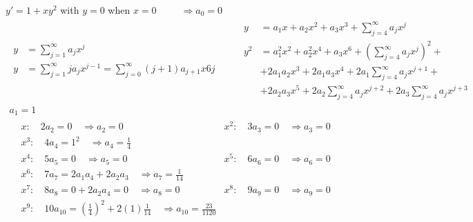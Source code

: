 \documentclass[twoside]{amsart}
\theoremstyle{plain}
\theoremstyle{definition}
\newcommand{\exercisehead}[1]
  {\smallskip
   \noindent{\small\bf Exercise #1.}}
\begin{document}
\exercisehead{13} $y' = 1 + xy^2$ with $y=0$ when $x=0$  $\quad \quad \, \Longrightarrow a_0 = 0$  
\[
\begin{gathered}
  \begin{aligned}
    y & = \sum_{j=1}^{\infty} a_j x^j \\
    y & = \sum_{j=1}^{\infty} j a_j x^{j-1} = \sum_{j=0}^{\infty} (j+1)a_{j+1} x6j 
  \end{aligned} \quad \quad \, 
\begin{aligned}
  y & = a_1 x + a_2 x^2 + a_3 x^3 + \sum_{j=4}^{\infty} a_j x^j \\
  y^2 & = a_1^2 x^2 + a_2^2 x^4 + a_3 x^6 + \left( \sum_{j=4}^{\infty}a_j x^j \right)^2 + \\
  & + 2 a_1 a_2 x^3 + 2 a_1 a_3 x^4 + 2a_1 \sum_{j=4}^{\infty} a_j x^{j+1} + \\
  & + 2a_2 a_3 x^5 + 2a_2 \sum_{j=4}^{\infty} a_j x^{j+2} + 2a_3 \sum_{j=4}^{\infty} a_j x^{j+3} 
\end{aligned} \\
\boxed{ a_1 = 1  } \\
\begin{aligned}
  & x: \quad 2a_2 = 0 \quad \Longrightarrow a_2 = 0  
  & x^2: \quad 3 a_3 = 0 \quad \Longrightarrow a_3 = 0 \\
  & x^3: \quad 4a_4 = 1^2 \quad \Longrightarrow \boxed{ a_4 = \frac{1}{4} }  \\
  & x^4: \quad 5a_5 = 0 \quad \Longrightarrow a_5 = 0 
  & x^5: \quad 6a_6 = 0  \quad \Longrightarrow a_6 = 0 \\
  & x^6: \quad 7a_7 = 2a_1 a_4 + 2a_2 a_3 \quad \Longrightarrow \boxed{ a_7 = \frac{1}{14} } \\
  & x^7: \quad 8a_8 = 0 + 2a_2 a_4 = 0 \quad \Longrightarrow a_8 = 0 
  & x^8: \quad 9a_9 = 0 \quad \Longrightarrow a_9 = 0 \\
  & x^9: \quad 10a_{10} = \left( \frac{1}{4}\right)^2 + 2 (1) \frac{1}{14} \quad \Longrightarrow \boxed{ a_{10} = \frac{23}{1120} } \\
\end{aligned}
\end{gathered}
\]
\end{document}
